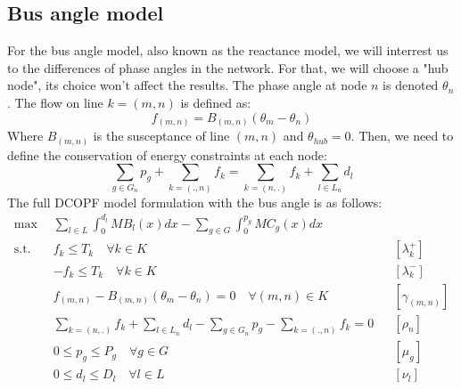 \documentclass[12pt, openany]{report}
\theoremstyle{definition}
\begin{document}
\subsection{Bus angle model}
For the bus angle model, also known as the reactance model, we will interrest us to the differences of phase angles in the network. For that, we will choose a "hub node", its choice won't affect the results. The phase angle at node $n$ is denoted $\theta_n$. The flow on line $k = (m,n)$ is defined as:
\begin{equation}
    f_{(m,n)} = B_{(m,n)} (\theta_m - \theta_n)
\end{equation}
Where $B_{(m,n)}$ is the susceptance of line $(m,n)$ and $\theta_{hub} = 0$. Then, we need to define the conservation of energy constraints at each node:
\begin{equation}
    \sum_{g \in G_n} p_g + \sum_{k = (.,n)} f_k = \sum_{k = (n,.)} f_k + \sum_{l \in L_n} d_l
\end{equation}
The full DCOPF model formulation with the bus angle is as follows:
\begin{equation}
    \begin{aligned}
        \max & \sum_{l \in L}  \int_{0}^{d_l} MB_l(x)dx - \sum_{g \in G} \int_{0}^{p_g} MC_g(x)dx &&\\
        \text{s.t.} \quad & f_k \leq T_k \quad \forall k \in K  && [\lambda_k^+] \\
        & -f_k \leq T_k \quad \forall k \in K  && [\lambda_k^-] \\
        & f_{(m,n)} - B_{(m,n)} (\theta_m - \theta_n) = 0 \quad \forall (m,n) \in K  && [\gamma_{(m,n)}] \\
        & \sum_{k = (n,.)} f_k + \sum_{l \in L_n} d_l - \sum_{g \in G_n} p_g - \sum_{k = (.,n)} f_k = 0  && [\rho_n] \\
        & 0 \leq p_g \leq P_g \quad \forall g \in G  && [\mu_g] \\
        & 0 \leq d_l \leq D_l \quad \forall l \in L  && [\nu_l] 
    \end{aligned}
\end{equation}
\end{document}
